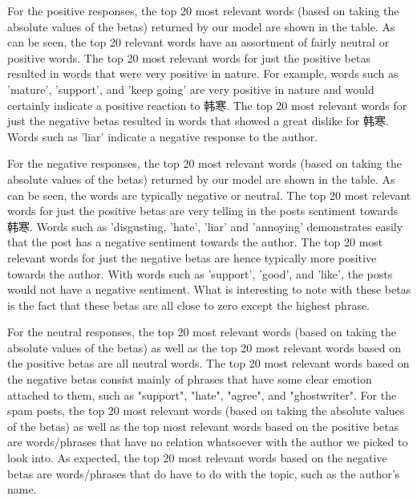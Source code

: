 \documentclass[11pt]{article}
\newcommand{\1}[1]{{\mathbf 1}\left\{#1\right\}}        %
\begin{document}
%

For the positive responses, the top 20 most relevant words (based on taking the absolute values of the betas) returned by our model are shown in the table. As can be seen, the top 20 relevant words have an assortment of fairly neutral or positive words. The top 20 most relevant words for just the positive betas resulted in words that were very positive in nature. For example, words such as 'mature', 'support', and 'keep going' are very positive in nature and would certainly indicate a positive reaction to 韩寒. The top 20 most relevant words for just the negative betas resulted in words that showed a great dislike for 韩寒.  Words such as 'liar' indicate a negative response to the author. 

For the negative responses, the top 20 most relevant words (based on taking the absolute values of the betas) returned by our model are shown in the table. As can be seen, the words are typically negative or neutral.  The top 20 most relevant words for just the positive betas are very telling in the posts sentiment towards 韩寒. Words such as 'disgusting, 'hate', 'liar' and 'annoying' demonstrates easily that the post has a negative sentiment towards the author. The top 20 most relevant words for just the negative betas are hence typically more positive towards the author. With words such as 'support', 'good', and 'like', the posts would not have a negative sentiment. What is interesting to note with these betas is the fact that these betas are all close to zero except the highest phrase. 

For the neutral responses, the top 20 most relevant words (based on taking the absolute values of the betas) as well as the top 20 most relevant words based on the positive betas are all neutral words. The top 20 most relevant words based on the negative betas consist mainly of phrases that have some clear emotion attached to them, such as "support", "hate", "agree", and "ghostwriter". For the spam posts, the top 20 most relevant words (based on taking the absolute values of the betas) as well as the top most relevant words based on the positive betas are words/phrases that have no relation whatsoever with the author we picked to look into.  As expected, the top 20 most relevant words based on the negative betas are words/phrases that do have to do with the topic, such as the author's name. 
\end{document}
